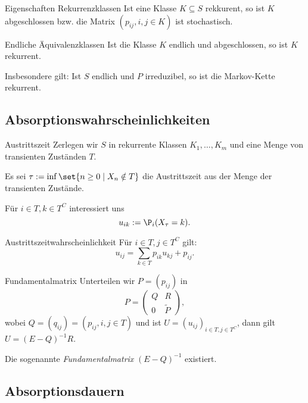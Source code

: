\begin{karte}{Eigenschaften Rekurrenzklassen}
    Ist eine Klasse \(K\subseteq S\) rekkurent, so ist \(K\) 
    abgeschlossen bzw. die Matrix \((p_{ij}, i,j\in K)\) ist stochastisch.
\end{karte}

\begin{karte}{Endliche Äquivalenzklassen}
    Ist die Klasse \(K\) endlich und abgeschlossen, so ist \(K\) rekurrent.

    Insbesondere gilt: Ist \(S\) endlich und \(P\) irreduzibel, so ist 
    die Markov-Kette rekurrent.
\end{karte}

\subsection*{Absorptionswahrscheinlichkeiten}

\begin{karte}{Austrittszeit}
    Zerlegen wir \(S\) in rekurrente Klassen \(K_1, \ldots, K_m\)
    und eine Menge von transienten Zuständen \(T\).

    Es sei \(\tau := \inf \set{n\geq 0 \;|\; X_n \notin T}\) die 
    Austrittszeit aus der Menge der transienten Zustände.

    Für \(i\in T, k \in T^C\) interessiert uns 
    \[ u_{ik} := \P_i(X_\tau = k). \]
\end{karte}

\begin{karte}{Austrittszeitwahrscheinlichkeit}
    Für \(i\in T, j \in T^C\) gilt:
    \[ u_{ij} = \sum_{k\in T} p_{ik} u_{kj} + p_{ij}. \]
\end{karte}

\begin{karte}{Fundamentalmatrix}
    Unterteilen wir \(P = (p_{ij})\) in 
    \[ P = \begin{pmatrix}
        Q & R \\ 0 & \tilde{P}
    \end{pmatrix}, \]
    wobei \(Q = (q_{ij}) = (p_{ij}, i,j\in T)\) und ist 
    \(U = (u_{ij})_{i\in T, j\in T^C}\),
    dann gilt \( U = (E - Q)^{-1} R \).

    Die sogenannte \textit{Fundamentalmatrix} \((E-Q)^{-1}\) 
    existiert.
\end{karte}

\subsection*{Absorptionsdauern}

